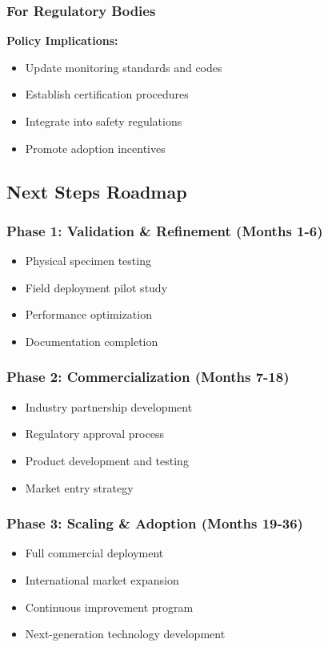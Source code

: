 \documentclass[12pt,a4paper]{article}
\begin{document}
\subsubsection{For Regulatory Bodies}

\textbf{Policy Implications:}
\begin{itemize}
    \item Update monitoring standards and codes
    \item Establish certification procedures
    \item Integrate into safety regulations
    \item Promote adoption incentives
\end{itemize}

\subsection{Next Steps Roadmap}

\subsubsection{Phase 1: Validation \& Refinement (Months 1-6)}
\begin{itemize}
    \item Physical specimen testing
    \item Field deployment pilot study
    \item Performance optimization
    \item Documentation completion
\end{itemize}

\subsubsection{Phase 2: Commercialization (Months 7-18)}
\begin{itemize}
    \item Industry partnership development
    \item Regulatory approval process
    \item Product development and testing
    \item Market entry strategy
\end{itemize}

\subsubsection{Phase 3: Scaling \& Adoption (Months 19-36)}
\begin{itemize}
    \item Full commercial deployment
    \item International market expansion
    \item Continuous improvement program
    \item Next-generation technology development
\end{itemize}
\end{document}
